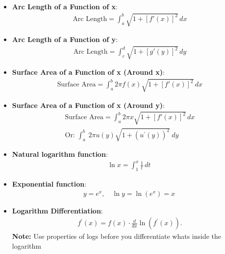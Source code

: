 \documentclass{report}
\begin{document}
\begin{itemize}
        \item \textbf{Arc Length of a Function of x}:
            \begin{align}
                \text{Arc Length} = \int_{a}^{b} \sqrt{1 + [f'(x)]^2} \, dx
            \end{align}

        \item \textbf{Arc Length of a Function of y}:
            \begin{align}
                \text{Arc Length} = \int_{c}^{d} \sqrt{1 + [g'(y)]^2} \, dy
            \end{align}

        \item \textbf{Surface Area of a Function of x (Around x)}:
            \begin{align}
                \text{Surface Area} = \int_{a}^{b} 2\pi f(x) \sqrt{1 + [f'(x)]^2} \, dx
            \end{align}

        \item \textbf{Surface Area of a Function of x (Around y)}:
            \begin{align}
                \text{Surface Area} = \int_{a}^{b} 2\pi x \sqrt{1 + [f'(x)]^2} \, dx \\
                \text{Or: } \int_{a}^{b}\ 2\pi u(y)\sqrt{1+(u^{\prime}(y))^{2}}\ dy
            \end{align}

        \item \textbf{Natural logarithm function}:
            \begin{align}
                \ln x = \int_{1}^{x} \frac{1}{t} \, dt\
            \end{align}

        \item \textbf{Exponential function}:
            \begin{align}
                y = e^x, \quad \ln y = \ln(e^x) = x\
            \end{align}

        \item \textbf{Logarithm Differentiation}:
            \begin{align*}
                f^{\prime}(x) = f(x) \cdot \frac{d}{dx}\ln{\left(f^{\prime}(x)\right)}
            .\end{align*}
            \textbf{Note:} Use properties of logs before you differentiate whats inside the logarithm


\end{itemize}
\end{document}
